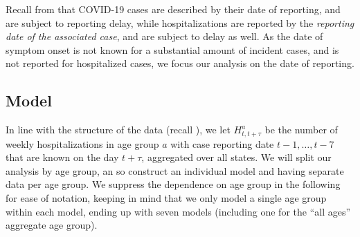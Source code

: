 Recall from  that COVID-19 cases are described by their date of reporting, and are subject to reporting delay, while hospitalizations are reported by the \textit{reporting date of the associated case}, and are subject to delay as well. As the date of symptom onset is not known for a substantial amount of incident cases, and is not reported for hospitalized cases, we focus our analysis on the date of reporting.

\subsection{Model}
In line with the structure of the data (recall ), we let $H^a_{t,t + \tau}$ be the number of weekly hospitalizations in age group $a$ with case reporting date $t - 1, \dots, t - 7$ that are known on the day $t + \tau$, aggregated over all states. We will split our analysis by age group, an so construct an individual model and having separate data per age group. We suppress the dependence on age group in the following for ease of notation, keeping in mind that we only model a single age group within each model, ending up with seven models (including one for the ``all ages'' aggregate age group). 


